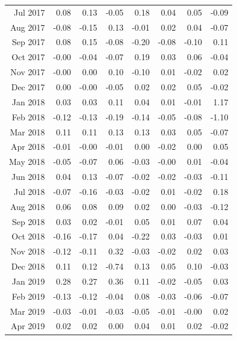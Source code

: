 \begin{tabularx}{\textwidth}{rrrrrrrr}
  Jul 2017 & 0.08 & 0.13 & -0.05 & 0.18 & 0.04 & 0.05 & -0.09 \\ 
  Aug 2017 & -0.08 & -0.15 & 0.13 & -0.01 & 0.02 & 0.04 & -0.07 \\ 
  Sep 2017 & 0.08 & 0.15 & -0.08 & -0.20 & -0.08 & -0.10 & 0.11 \\ 
  Oct 2017 & -0.00 & -0.04 & -0.07 & 0.19 & 0.03 & 0.06 & -0.04 \\ 
  Nov 2017 & -0.00 & 0.00 & 0.10 & -0.10 & 0.01 & -0.02 & 0.02 \\ 
  Dec 2017 & 0.00 & -0.00 & -0.05 & 0.02 & 0.02 & 0.05 & -0.02 \\ 
  Jan 2018 & 0.03 & 0.03 & 0.11 & 0.04 & 0.01 & -0.01 & 1.17 \\ 
  Feb 2018 & -0.12 & -0.13 & -0.19 & -0.14 & -0.05 & -0.08 & -1.10 \\ 
  Mar 2018 & 0.11 & 0.11 & 0.13 & 0.13 & 0.03 & 0.05 & -0.07 \\ 
  Apr 2018 & -0.01 & -0.00 & -0.01 & 0.00 & -0.02 & 0.00 & 0.05 \\ 
  May 2018 & -0.05 & -0.07 & 0.06 & -0.03 & -0.00 & 0.01 & -0.04 \\ 
  Jun 2018 & 0.04 & 0.13 & -0.07 & -0.02 & -0.02 & -0.03 & -0.11 \\ 
  Jul 2018 & -0.07 & -0.16 & -0.03 & -0.02 & 0.01 & -0.02 & 0.18 \\ 
  Aug 2018 & 0.06 & 0.08 & 0.09 & 0.02 & 0.00 & -0.03 & -0.12 \\ 
  Sep 2018 & 0.03 & 0.02 & -0.01 & 0.05 & 0.01 & 0.07 & 0.04 \\ 
  Oct 2018 & -0.16 & -0.17 & 0.04 & -0.22 & 0.03 & -0.03 & 0.01 \\ 
  Nov 2018 & -0.12 & -0.11 & 0.32 & -0.03 & -0.02 & 0.02 & 0.03 \\ 
  Dec 2018 & 0.11 & 0.12 & -0.74 & 0.13 & 0.05 & 0.10 & -0.03 \\ 
  Jan 2019 & 0.28 & 0.27 & 0.36 & 0.11 & -0.02 & -0.05 & 0.03 \\ 
  Feb 2019 & -0.13 & -0.12 & -0.04 & 0.08 & -0.03 & -0.06 & -0.07 \\ 
  Mar 2019 & -0.03 & -0.01 & -0.03 & -0.05 & -0.01 & -0.00 & 0.02 \\ 
  Apr 2019 & 0.02 & 0.02 & 0.00 & 0.04 & 0.01 & 0.02 & -0.02 \\ 
   \hline
\end{tabularx}
